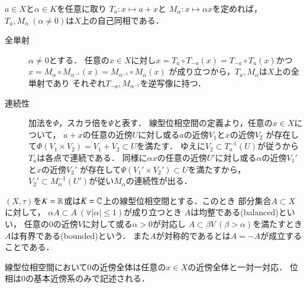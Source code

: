 	\begin{screen}
		\begin{thm}
			$a \in X$と$\alpha \in K$を任意に取り
			$T_a:x \longmapsto a + x$と
			$M_\alpha:x \longmapsto \alpha x$を定めれば，
			$T_a,M_\alpha\ (\alpha \neq 0)$は$X$上の自己同相である．
		\end{thm}
	\end{screen}
	
	\begin{prf}\mbox{}
		\begin{description}
			\item[全単射]
				$\alpha \neq 0$とする．
				任意の$x \in X$に対し$x = T_a \circ T_{-a} (x) = T_{-a} \circ T_{a}(x)$かつ
				$x = M_{\alpha} \circ M_{\alpha^{-1}}(x) = M_{\alpha^{-1}} \circ M_{\alpha}(x)$
				が成り立つから，$T_a,M_\alpha$は$X$上の全単射であり
				それぞれ$T_{-a},M_{\alpha^{-1}}$を逆写像に持つ．
				
			\item[連続性]
				加法を$\Phi$，スカラ倍を$\Psi$と表す．
				線型位相空間の定義より，任意の$x \in X$について，
				$a + x$の任意の近傍$U$に対し或る$a$の近傍$V_1$と$x$の近傍$V_2$
				が存在して$\Phi(V_1 \times V_2) = V_1 + V_2 \subset U$を満たす．
				ゆえに$V_2 \subset T_a^{-1}(U)$が従うから
				$T_a$は各点で連続である．
				同様に$\alpha x$の任意の近傍$U'$に対し或る$\alpha$の近傍$V_1'$と$x$の近傍$V_2'$
				が存在して$\Psi(V_1' \times V_2') \subset U$を満たすから，
				$V_2' \subset M_\alpha^{-1}(U')$が従い$M_\alpha$の連続性が出る．
				\QED
		\end{description}
	\end{prf}
	
	\begin{screen}
		\begin{dfn}
			$(X,\tau)$を$K = \mathbb{R}$或は$K = \mathbb{C}$上の線型位相空間とする．このとき
			部分集合$A \subset X$に対して，
			$\alpha A \subset A\ (\forall |\alpha| \leq 1)$が成り立つとき
			$A$は均整である(balanced)といい，
			任意の0の近傍$V$に対して或る$\alpha > 0$が対応し
			$A \subset \beta V\ (\beta > \alpha)$を満たすとき$A$は有界である(bounded)という．
			また$A$が対称的であるとは$A = -A$が成立することである．
		\end{dfn}
	\end{screen}
	
	\begin{screen}
		\begin{thm}[]
			線型位相空間において$0$の近傍全体は任意の$x \in X$の近傍全体と一対一対応．
			位相は$0$の基本近傍系のみで記述される．
		\end{thm}
	\end{screen}
	
